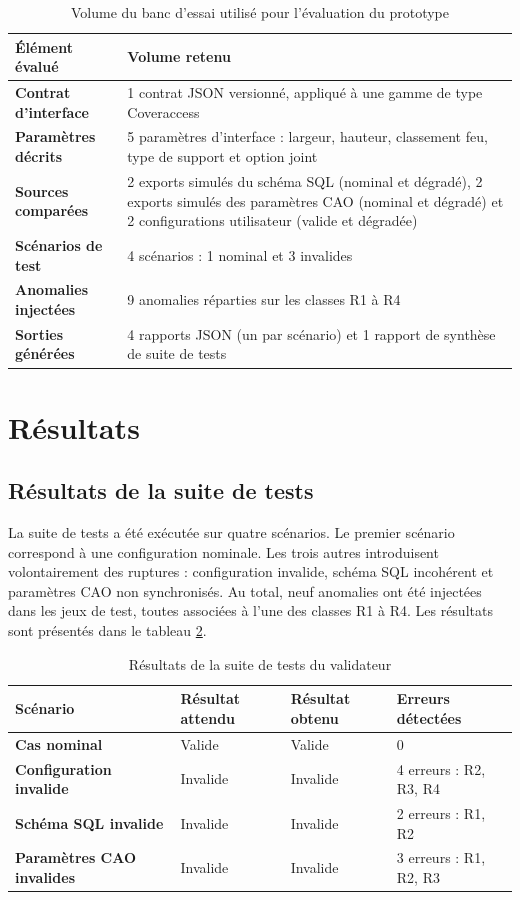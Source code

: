 \begin{table}[H]
\centering
\caption{Volume du banc d'essai utilisé pour l'évaluation du prototype}
\label{tab:volume-prototype}
\begin{tabularx}{\textwidth}{>{\bfseries}p{}X}
\toprule
Élément évalué & Volume retenu \\
\midrule
Contrat d'interface & 1 contrat JSON versionné, appliqué à une gamme de type Coveraccess \\
Paramètres décrits & 5 paramètres d'interface : largeur, hauteur, classement feu, type de support et option joint \\
Sources comparées & 2 exports simulés du schéma SQL (nominal et dégradé), 2 exports simulés des paramètres CAO (nominal et dégradé) et 2 configurations utilisateur (valide et dégradée) \\
Scénarios de test & 4 scénarios : 1 nominal et 3 invalides \\
Anomalies injectées & 9 anomalies réparties sur les classes R1 à R4 \\
Sorties générées & 4 rapports JSON (un par scénario) et 1 rapport de synthèse de suite de tests \\
\bottomrule
\end{tabularx}
\end{table}

\section{Résultats}

\subsection{Résultats de la suite de tests}

La suite de tests a été exécutée sur quatre scénarios. Le premier scénario correspond à une configuration nominale. Les trois autres introduisent volontairement des ruptures : configuration invalide, schéma SQL incohérent et paramètres CAO non synchronisés. Au total, neuf anomalies ont été injectées dans les jeux de test, toutes associées à l'une des classes R1 à R4. Les résultats sont présentés dans le tableau \ref{tab:suite-tests}.

\begin{table}[H]
\centering
\caption{Résultats de la suite de tests du validateur}
\label{tab:suite-tests}
\begin{tabularx}{\textwidth}{>{\bfseries}p{}p{}p{}X}
\toprule
Scénario & Résultat attendu & Résultat obtenu & Erreurs détectées \\
\midrule
Cas nominal & Valide & Valide & 0 \\
Configuration invalide & Invalide & Invalide & 4 erreurs : R2, R3, R4 \\
Schéma SQL invalide & Invalide & Invalide & 2 erreurs : R1, R2 \\
Paramètres CAO invalides & Invalide & Invalide & 3 erreurs : R1, R2, R3 \\
\bottomrule
\end{tabularx}
\end{table}

